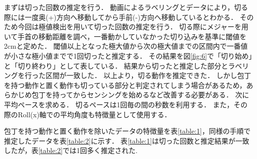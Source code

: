 
まずは切った回数の推定を行う．
動画によるラベリングとデータにより，切る際には一度奥(+)方向へ移動してから手前(-)方向へ移動しているとわかる．
そのため今回は極値検出を用いて切った回数の推定を行う．
切る際にメジャーを用いて手首の移動距離を調べ，一番動かしていなかった切り込みを基準に閾値を2cmと定めた．
閾値以上となった極大値から次の極大値までの区間内で一番値が小さな極小値までで1回切ったと推定する．
その結果を図\ref{fig:6}で「切り始め」と「切り終わり」として表している．
結果から切ったと推定した部分とラベリングを行った区間が一致した．
以上より，切る動作を推定できた．
しかし包丁を持つ動作と置く動作も切っている部分と判定されてしまう場合があるため，あらかじめ包丁を持ってからセンシングを始めるなど改善する必要がある．
次に平均ペースを求める．
切るペースは1回毎の間の秒数を利用する．
また，その際のRoll(x)軸での平均角度も特徴量として使用する．

包丁を持つ動作と置く動作を除いたデータの特徴量を表\ref{table:1}，同様の手順で推定したデータを表\ref{table:2}に示す．
表\ref{table:1}は切った回数と推定結果が一致したが，表\ref{table:2}では1回多く推定された.
\begin{table}[ht]
    \centering
    \caption{平造りの特徴量}
    \label{table:1}
\end{table}

